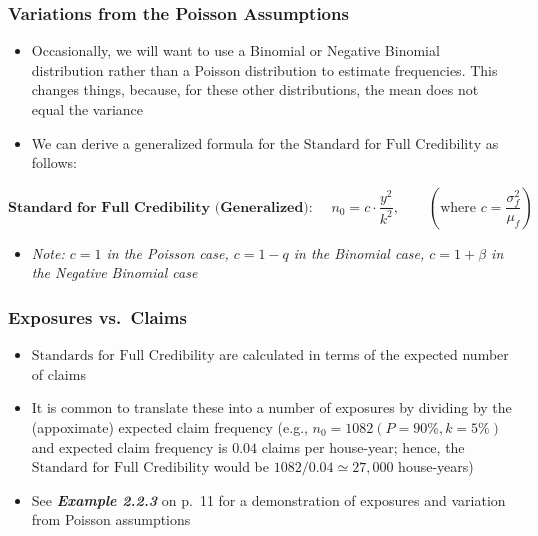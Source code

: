 \documentclass[
]{article}
\providecommand{\tightlist}{%
  \setlength{\itemsep}{0pt}\setlength{\parskip}{0pt}}
\begin{document}
\begin{red}

\hypertarget{variations-from-the-poisson-assumptions}{%
\subsubsection{Variations from the Poisson
Assumptions}\label{variations-from-the-poisson-assumptions}}

\begin{itemize}
\item
  Occasionally, we will want to use a Binomial or Negative Binomial
  distribution rather than a Poisson distribution to estimate
  frequencies. This changes things, because, for these other
  distributions, the mean does not equal the variance
\item
  We can derive a generalized formula for the
  \(\text{Standard for Full Credibility}\) as follows:
\end{itemize}

\[
  \textbf{Standard for Full Credibility (Generalized): }  \quad n_0 = c \cdot \dfrac{y^2}{k^2}, \quad \quad \left(\text{where } c = \dfrac{\sigma_f^2}{\mu_f} \right)
\]

\begin{itemize}
\tightlist
\item
  \emph{Note: \(c=1\) in the Poisson case, \(c=1-q\) in the Binomial
  case, \(c=1+\beta\) in the Negative Binomial case}
\end{itemize}

\end{red}

\begin{purple}

\hypertarget{exposures-vs.-claims}{%
\subsubsection{Exposures vs.~Claims}\label{exposures-vs.-claims}}

\begin{itemize}
\item
  \(\text{Standards for Full Credibility}\) are calculated in terms of
  the expected number of claims
\item
  It is common to translate these into a number of exposures by dividing
  by the (appoximate) expected claim frequency (e.g.,
  \(n_0 = 1082 (P=90\%, k=5\%)\) and expected claim frequency is
  \(0.04\) claims per house-year; hence, the
  \(\text{Standard for Full Credibility}\) would be
  \(1082/0.04\simeq 27,000\) house-years)
\item
  See \textbf{\emph{Example 2.2.3}} on p.~11 for a demonstration of
  exposures and variation from Poisson assumptions
\end{itemize}

\end{purple}
\end{document}
